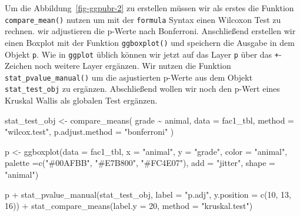 \documentclass[
  letterpaper,
]{scrbook}
\newenvironment{Shaded}{\begin{snugshade}}{\end{snugshade}}
\newcommand{\AttributeTok}[1]{\textcolor[rgb]{0.40,0.45,0.13}{#1}}
\newcommand{\DecValTok}[1]{\textcolor[rgb]{0.68,0.00,0.00}{#1}}
\newcommand{\FunctionTok}[1]{\textcolor[rgb]{0.28,0.35,0.67}{#1}}
\newcommand{\NormalTok}[1]{\textcolor[rgb]{0.00,0.23,0.31}{#1}}
\newcommand{\OtherTok}[1]{\textcolor[rgb]{0.00,0.23,0.31}{#1}}
\newcommand{\SpecialCharTok}[1]{\textcolor[rgb]{0.37,0.37,0.37}{#1}}
\newcommand{\StringTok}[1]{\textcolor[rgb]{0.13,0.47,0.30}{#1}}
\begin{document}
Um die Abbildung~\ref{fig-ggpubr-2} zu erstellen müssen wir als erstes
die Funktion \texttt{compare\_mean()} nutzen um mit der \texttt{formula}
Syntax einen Wilcoxon Test zu rechnen. wir adjustieren die p-Werte nach
Bonferroni. Anschließend erstellen wir einen Boxplot mit der Funktion
\texttt{ggboxplot()} und speichern die Ausgabe in dem Objekt \texttt{p}.
Wie in \texttt{ggplot} üblich können wir jetzt auf das Layer \texttt{p}
über das \texttt{+}-Zeichen noch weitere Layer ergänzen. Wir nutzen die
Funktion \texttt{stat\_pvalue\_manual()} um die asjustierten p-Werte aus
dem Objekt \texttt{stat\_test\_obj} zu ergänzen. Abschließend wollen wir
noch den p-Wert eines Kruskal Wallis als globalen Test ergänzen.

\begin{Shaded}
\begin{Highlighting}[]
\NormalTok{stat\_test\_obj }\OtherTok{\textless{}{-}} \FunctionTok{compare\_means}\NormalTok{(}
\NormalTok{ grade }\SpecialCharTok{\textasciitilde{}}\NormalTok{ animal, }\AttributeTok{data =}\NormalTok{ fac1\_tbl,}
 \AttributeTok{method =} \StringTok{"wilcox.test"}\NormalTok{,}
 \AttributeTok{p.adjust.method =} \StringTok{"bonferroni"}
\NormalTok{)}

\NormalTok{p }\OtherTok{\textless{}{-}} \FunctionTok{ggboxplot}\NormalTok{(}\AttributeTok{data =}\NormalTok{ fac1\_tbl, }\AttributeTok{x =} \StringTok{"animal"}\NormalTok{, }\AttributeTok{y =} \StringTok{"grade"}\NormalTok{,}
               \AttributeTok{color =} \StringTok{"animal"}\NormalTok{, }\AttributeTok{palette =}\FunctionTok{c}\NormalTok{(}\StringTok{"\#00AFBB"}\NormalTok{, }\StringTok{"\#E7B800"}\NormalTok{, }\StringTok{"\#FC4E07"}\NormalTok{),}
               \AttributeTok{add =} \StringTok{"jitter"}\NormalTok{, }\AttributeTok{shape =} \StringTok{"animal"}\NormalTok{)}

\NormalTok{p }\SpecialCharTok{+} \FunctionTok{stat\_pvalue\_manual}\NormalTok{(stat\_test\_obj, }\AttributeTok{label =} \StringTok{"p.adj"}\NormalTok{, }\AttributeTok{y.position =} \FunctionTok{c}\NormalTok{(}\DecValTok{10}\NormalTok{, }\DecValTok{13}\NormalTok{, }\DecValTok{16}\NormalTok{)) }\SpecialCharTok{+}
  \FunctionTok{stat\_compare\_means}\NormalTok{(}\AttributeTok{label.y =} \DecValTok{20}\NormalTok{, }\AttributeTok{method =} \StringTok{"kruskal.test"}\NormalTok{)    }
\end{Highlighting}
\end{Shaded}
\end{document}
